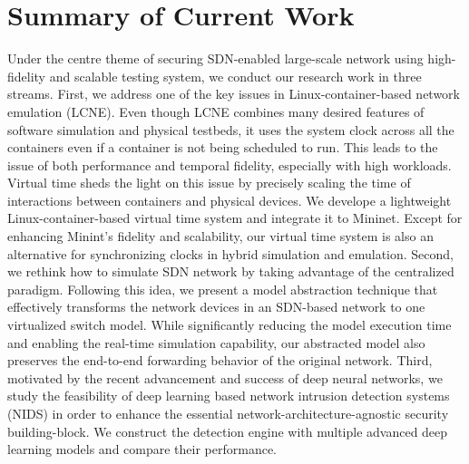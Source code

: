 \label{Sec:Conclusion}

\section{Summary of Current Work}

Under the centre theme of securing SDN-enabled large-scale network using high-fidelity and scalable testing system, we conduct our research work in three streams.
First, we address one of the key issues in Linux-container-based network emulation (LCNE).
Even though LCNE combines many desired features of software simulation and physical testbeds,
it uses the system clock across all the containers even if a container is not being scheduled to run.
This leads to the issue of both performance and temporal fidelity, especially with high workloads.
Virtual time sheds the light on this issue by precisely scaling the time of interactions between containers and physical devices.
We develope a lightweight Linux-container-based virtual time system and integrate it to Mininet.
Except for enhancing Minint's fidelity and scalability,
our virtual time system is also an alternative for synchronizing clocks in hybrid simulation and emulation.
Second, we rethink how to simulate SDN network by taking advantage of the centralized paradigm.
Following this idea, we present a model abstraction technique that effectively transforms
the network devices in an SDN-based network to one virtualized switch model.
While significantly reducing the model execution time and enabling the real-time simulation capability,
our abstracted model also preserves the end-to-end forwarding behavior of the original network.
Third, motivated by the recent advancement and success of deep neural networks,
we study the feasibility of deep learning based network intrusion detection systems (NIDS) in order to enhance the essential network-architecture-agnostic security building-block.
We construct the detection engine with multiple advanced deep learning models and compare their performance.

